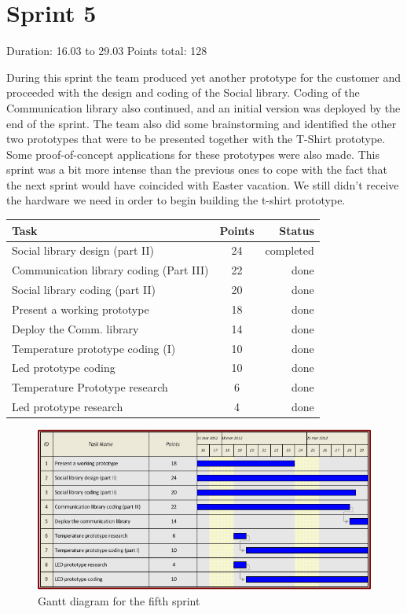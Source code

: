 \section{Sprint 5}

Duration: 16.03 to 29.03
Points total: 128

During this sprint the team produced yet another prototype for the customer
and proceeded with the design and coding of the Social library.
Coding of the Communication library also continued, and an initial version
was deployed by the end of the sprint. The team also did some brainstorming
and identified the other two prototypes that were to be presented together with
the T-Shirt prototype. Some proof-of-concept applications for these
prototypes were also made. This sprint was a bit more intense than the previous
ones to cope with the fact that the next sprint would have coincided with Easter vacation.
We still didn't receive the hardware we need in order to begin building the t-shirt
prototype.

\begin{table}[ht!]
\begin{tabular}{ | l | c | r | }

\hline
\textbf{Task} & \textbf{Points} & \textbf{Status} \\
\hline

Social library design (part II)     & 24 & completed \\
\hline
Communication library coding (Part III) & 22 & done \\
\hline
Social library coding (part II)     & 20 & done \\
\hline
Present a working prototype		& 18 & done \\
\hline
Deploy the Comm. library		& 14 & done \\
\hline
Temperature prototype coding (I)    & 10 & done \\
\hline
Led prototype coding            & 10 & done \\
\hline
Temperature Prototype research		& 6  & done \\
\hline
Led prototype research			& 4  & done \\
\hline


\end{tabular}
\end{table}


\begin{figure}[h!]
\centering \includegraphics[scale=0.8]{img/sprints-gantt5.png}
\caption{Gantt diagram for the fifth sprint}
\label{fig:sprints-gantt5}
\end{figure}


